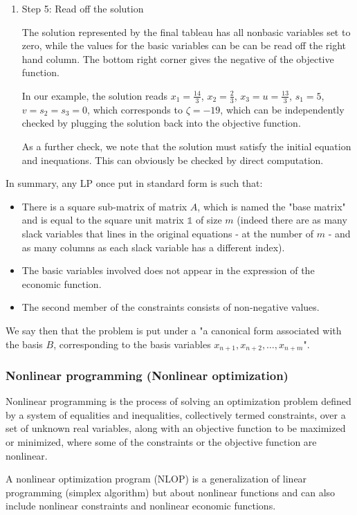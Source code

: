 \begin{enumerate}
	\item Step 5: Read off the solution

	The solution represented by the final tableau has all nonbasic
	variables set to zero, while the values for the basic variables can be
	can be read off the right hand column.  The bottom right corner gives
	the negative of the objective function.
	
	In our example, the solution reads $x_1=\tfrac{14}3$, $x_2=\tfrac23$,
	$x_3=u=\tfrac{13}3$, $s_1=5$, $v=s_2=s_3=0$, which corresponds to
	$\zeta=-19$, which can be independently checked by plugging the
	solution back into the objective function.
	
	As a further check, we note that the solution must satisfy the initial equation and inequations.  This can obviously be checked by direct computation.
	\end{enumerate}
	In summary, any LP once put in standard form is such that:
	\begin{itemize}
		\item There is a square sub-matrix of matrix $A$, which is named the "base matrix" and is equal to the square unit matrix $\mathds{1}$ of size $m$ (indeed there are as many slack variables that lines in the original equations - at the number of $m$ - and as many columns as each slack variable has a different index).

		\item The basic variables involved does not appear in the expression of the economic function.

		\item The second member of the constraints consists of non-negative values.
	\end{itemize}
	We say then that the problem is put under a "a canonical form associated with the basis $B$, corresponding to the basis variables $x_{n+1},x_{n+2},\ldots,x_{n+m}$".
	
	\subsubsection{Nonlinear programming (Nonlinear optimization)}
	Nonlinear programming is the process of solving an optimization problem defined by a system of equalities and inequalities, collectively termed constraints, over a set of unknown real variables, along with an objective function to be maximized or minimized, where some of the constraints or the objective function are nonlinear. 
	
	A nonlinear optimization program (NLOP) is a generalization of linear programming (simplex algorithm) but about nonlinear functions and can also include nonlinear constraints and nonlinear economic functions.


